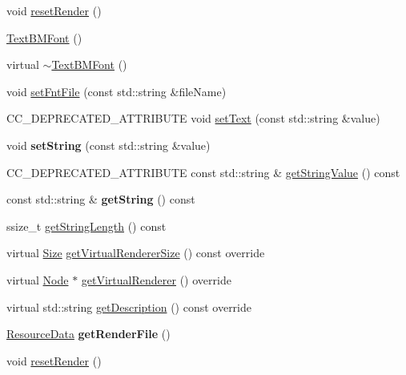 \begin{DoxyCompactItemize}
\item 
void \hyperlink{classui_1_1TextBMFont_aaa506a5c411cfb4edcebe0e086251721}{reset\+Render} ()
\item 
\hyperlink{classui_1_1TextBMFont_a1dd2e9b92ea5a445e1a7512485a06cfe}{Text\+B\+M\+Font} ()
\item 
virtual \hyperlink{classui_1_1TextBMFont_aaa4103fe8d11971593b1ec34c947de3a}{$\sim$\+Text\+B\+M\+Font} ()
\item 
void \hyperlink{classui_1_1TextBMFont_adaef5e07e587002487250c639a51f4e8}{set\+Fnt\+File} (const std\+::string \&file\+Name)
\item 
C\+C\+\_\+\+D\+E\+P\+R\+E\+C\+A\+T\+E\+D\+\_\+\+A\+T\+T\+R\+I\+B\+U\+TE void \hyperlink{classui_1_1TextBMFont_a7709799981f60b2586798726a674946f}{set\+Text} (const std\+::string \&value)
\item 
\mbox{\label{classui_1_1TextBMFont_af99dab9559041d10486eee8c2cdd1933}} 
void {\bfseries set\+String} (const std\+::string \&value)
\item 
C\+C\+\_\+\+D\+E\+P\+R\+E\+C\+A\+T\+E\+D\+\_\+\+A\+T\+T\+R\+I\+B\+U\+TE const std\+::string \& \hyperlink{classui_1_1TextBMFont_acad372a897b448f298d708dfca2d4997}{get\+String\+Value} () const
\item 
\mbox{\label{classui_1_1TextBMFont_a3072a90bb2553cdcb6f6ddf4f7317243}} 
const std\+::string \& {\bfseries get\+String} () const
\item 
ssize\+\_\+t \hyperlink{classui_1_1TextBMFont_adcae15f2ec3e20f18834b3e5afb3de37}{get\+String\+Length} () const
\item 
virtual \hyperlink{classSize}{Size} \hyperlink{classui_1_1TextBMFont_a9ee876578d52a27bc967271ea3fa2b19}{get\+Virtual\+Renderer\+Size} () const override
\item 
virtual \hyperlink{classNode}{Node} $\ast$ \hyperlink{classui_1_1TextBMFont_a7a78528934f644fac429d3107e8b2f94}{get\+Virtual\+Renderer} () override
\item 
virtual std\+::string \hyperlink{classui_1_1TextBMFont_ab0472d58930e8b0f290e69ac13756353}{get\+Description} () const override
\item 
\mbox{\label{classui_1_1TextBMFont_a4759af679f1c5091b6d0d9c04363be78}} 
\hyperlink{structResourceData}{Resource\+Data} {\bfseries get\+Render\+File} ()
\item 
void \hyperlink{classui_1_1TextBMFont_aaa506a5c411cfb4edcebe0e086251721}{reset\+Render} ()
\end{DoxyCompactItemize}
